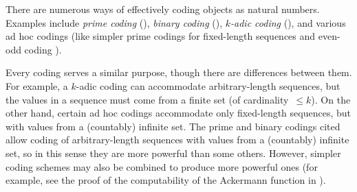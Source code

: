 \begin{rmk}
There are numerous ways of effectively coding objects as natural numbers. Examples include \emph{prime coding} (\cite[p.~41]{cutland80}), \emph{binary coding} (\cite[ex.~2.4.16(5)]{cutland80}), \emph{\(k\)-adic coding} (\cite[p.~61]{cutland80}), and various ad hoc codings (like simpler prime codings for fixed-length sequences and even-odd coding \cite[ex.~2.4.16(2)]{cutland80}).

Every coding serves a similar purpose, though there are differences between them. For example, a \(k\)-adic coding can accommodate arbitrary-length sequences, but the values in a sequence must come from a finite set (of cardinality~\(\le k\)). On the other hand, certain ad hoc codings accommodate only fixed-length sequences, but with values from a (countably) infinite set. The prime and binary codings cited allow coding of arbitrary-length sequences with values from a (countably) infinite set, so in this sense they are more powerful than some others. However, simpler coding schemes may also be combined to produce more powerful ones (for example, see the proof of the computability of the Ackermann function in \cite[p.~46--47]{cutland80}).
\end{rmk}
